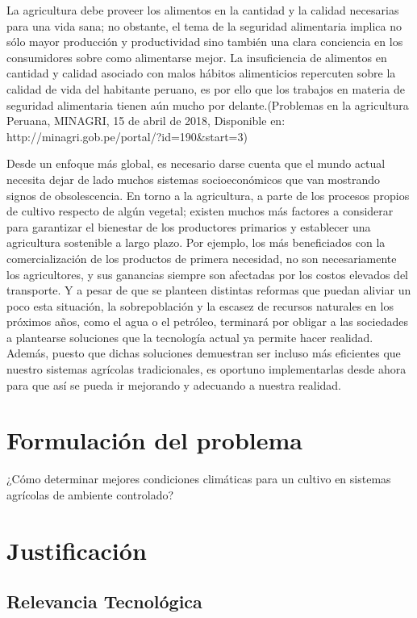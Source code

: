 \documentclass{report}
\begin{document}
La agricultura debe proveer los alimentos en la cantidad y la calidad necesarias
para una vida sana; no obstante, el tema de la seguridad alimentaria implica no
sólo mayor producción y productividad sino también una clara conciencia en los
consumidores sobre como alimentarse mejor. La insuficiencia de alimentos en
cantidad y calidad asociado con malos hábitos alimenticios repercuten sobre la
calidad de vida del habitante peruano, es por ello que los trabajos en materia
de seguridad alimentaria tienen aún mucho por delante.(Problemas en la
agricultura Peruana, MINAGRI, 15 de abril de 2018,  Disponible en:
http://minagri.gob.pe/portal/?id=190&start=3)

Desde un enfoque más global, es necesario darse cuenta que el mundo actual
necesita dejar de lado muchos sistemas socioeconómicos que van mostrando signos
de obsolescencia. En torno a la agricultura, a parte de los procesos propios de
cultivo respecto de algún vegetal; existen muchos más factores a considerar para
garantizar el bienestar de los productores primarios y establecer una
agricultura sostenible a largo plazo. Por ejemplo, los más beneficiados con la
comercialización de los productos de primera necesidad, no son necesariamente
los agricultores, y sus ganancias siempre son afectadas por los costos elevados
del transporte. Y a pesar de que se planteen distintas reformas que puedan
aliviar un poco esta situación, la sobrepoblación y la escasez de recursos
naturales en los próximos años, como el agua o el petróleo, terminará por
obligar a las sociedades a plantearse soluciones que la tecnología actual ya
permite hacer realidad. Además, puesto que dichas soluciones demuestran ser
incluso más eficientes que nuestro sistemas agrícolas tradicionales, es oportuno
implementarlas desde ahora para que así se pueda ir mejorando y adecuando a
nuestra realidad.
\section{Formulación del problema}
¿Cómo determinar mejores condiciones climáticas para un cultivo en sistemas
agrícolas de ambiente controlado?
\section{Justificación}
\subsection{Relevancia Tecnológica}
  
\end{document}
